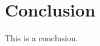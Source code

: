 \documentclass[e-only,10pt,reqno]{ofj}
\newcommand{\authorcontributions}[1]{%
\vspace{6pt}\noindent{\fontsize{9}{11.2}\selectfont\textbf{Author Contributions:} {#1}\par}}
\begin{document}
\section{Conclusion}

This is a conclusion.


%





%
%




\end{document}
